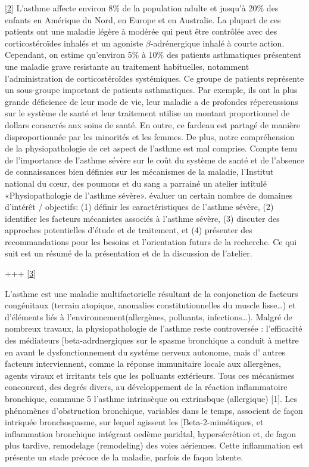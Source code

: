 \documentclass[12pt,]{article}
\begin{document}
{[}\protect\hyperlink{ref-busse2000pathophysiology}{2}{]} L'asthme
affecte environ 8\% de la population adulte et jusqu'à 20\% des enfants
en Amérique du Nord, en Europe et en Australie. La plupart de ces
patients ont une maladie légère à modérée qui peut être contrôlée avec
des corticostéroïdes inhalés et un agoniste \(\beta\)-adrénergique
inhalé à courte action. Cependant, on estime qu'environ 5\% à 10\% des
patients asthmatiques présentent une maladie grave resistante au
traitement habituelles, notamment l'administration de corticostéroïdes
systémiques. Ce groupe de patients représente un sous-groupe important
de patients asthmatiques. Par exemple, ils ont la plus grande déficience
de leur mode de vie, leur maladie a de profondes répercussions sur le
système de santé et leur traitement utilise un montant proportionnel de
dollars consacrés aux soins de santé. En outre, ce fardeau est partagé
de manière disproportionnée par les minorités et les femmes. De plus,
notre compréhension de la physiopathologie de cet aspect de l'asthme est
mal comprise. Compte tenu de l'importance de l'asthme sévère sur le coût
du système de santé et de l'absence de connaissances bien définies sur
les mécanismes de la maladie, l'Institut national du cœur, des poumons
et du sang a parrainé un atelier intitulé «Physiopathologie de l'asthme
sévère». évaluer un certain nombre de domaines d'intérêt / objectifs:
(1) définir les caractéristiques de l'asthme sévère, (2) identifier les
facteurs mécanistes associés à l'asthme sévère, (3) discuter des
approches potentielles d'étude et de traitement, et (4) présenter des
recommandations pour les besoins et l'orientation futurs de la
recherche. Ce qui suit est un résumé de la présentation et de la
discussion de l'atelier.

+++ {[}\protect\hyperlink{ref-tillie2004physiopathologie}{3}{]}

L'asthme est une maladie multifactorielle résultant de la conjonction de
facteurs congénitaux (terrain atopique, anomalies constitutionnelles du
muscle lisse\ldots{}) et d'éléments liés à l'environnement(allergènes,
polluants, infections\ldots{}). Malgré de nombreux travaux, la
physiopathologie de l'asthme reste controversée : l'efficacité des
médiateurs {[}beta-adrdnergiques sur le spasme bronchique a conduit à
mettre en avant le dysfonctionnement du systéme nerveux autonome, mais
d' autres facteurs interviennent, comme la réponse immunitaire locale
aux allergènes, agents viraux et irritants tels que les polluants
extérieurs. Tous ces mécanismes concourent, des degrés divers, au
développement de la réaction inflammatoire bronchique, commune 5
l'asthme intrinsèque ou extrinsbque (allergique) {[}1{]}. Les phénomènes
d'obstruction bronchique, variables dans le temps, associent de façon
intriquée bronchospasme, sur lequel agissent les {[}Beta-2-mimétiques,
et inflammation bronchique intégrant oedème paridtal, hypersécrétion et,
de fagon plus tardive, remodelage (remodeling) des voies aériennes.
Cette inflammation est présente un stade précoce de la maladie, parfois
de faqon latente.
\end{document}
